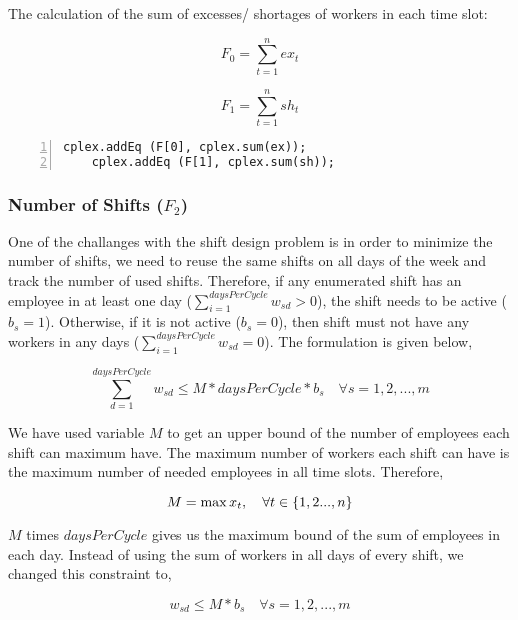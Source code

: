 The calculation of the sum of excesses/ shortages of workers in each time slot:

\begin{equation}
F_0 = \sum_{t=1}^n ex_t
\end{equation}

\begin{equation}
F_1 = \sum_{t=1}^n sh_t
\end{equation}


\begin{lstlisting}[frame=single, numbers=left]
	cplex.addEq (F[0], cplex.sum(ex));
	cplex.addEq (F[1], cplex.sum(sh));
\end{lstlisting}


\subsubsection{Number of Shifts ($F_2 $)} One of the challanges with the shift design problem is in order to minimize the number of shifts, we need to reuse the same shifts on all days of the week and track the number of used shifts. Therefore, if any enumerated shift has an employee in at least one day ($\sum_{i=1}^{daysPerCycle} w_{sd} > 0$), the shift needs to be active ($b_s =1$). Otherwise, if it is not active  ($b_s =0$), then shift must not have any workers in any days ($\sum_{i=1}^{daysPerCycle} w_{sd} = 0$).
The formulation is given below, 

\begin{equation}
\sum_{d=1}^{daysPerCycle} w_{sd} \le M * daysPerCycle * b_s \quad \forall s = 1, 2, ..., m
\end{equation}

We have used variable $M$ to get an upper bound of the number of employees each shift can maximum have. The maximum number of workers each shift can have is the maximum number of needed employees in all time slots. Therefore,

\begin{equation}
M = \max  x_t,  \quad \forall t \in \{1,2 ... , n\} \\
\end{equation}

 $M$ times $daysPerCycle$ gives us the maximum bound of the sum of employees in each day. Instead of using the sum of workers in all days of every shift, we changed this constraint to,

\begin{equation}
w_{sd} \le M * b_s \quad \forall s = 1, 2, ..., m
\end{equation}

